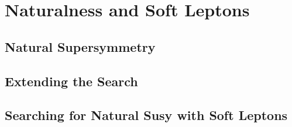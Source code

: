 \chapter{Naturalness and Soft Leptons}
\label{ch:soft}

\section{Natural Supersymmetry}
\label{sec:natural}

\section{Extending the \mttwo Search}
\label{sec:extend}

\section{Searching for Natural Susy with Soft Leptons}
\label{sec:softmt2}
